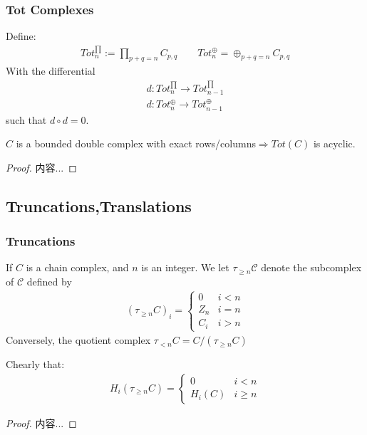 \documentclass[Total.tex]{subfiles}
\begin{document}
			\subsubsection{Tot Complexes}
			\begin{Def}
				Define:
				\begin{gather*}
					Tot^{\prod}_n:= \prod_{p+q=n} C_{p,q}\qquad  Tot^{\oplus}_n=\oplus_{p+q=n}C_{p,q}
				\end{gather*}
				With the differential
				\begin{gather*}
					d:Tot^{\prod}_n\rightarrow Tot^{\prod}_{n-1}\\
					d:Tot^{\oplus}_n\rightarrow Tot^{\oplus}_{n-1}
				\end{gather*}
				such that $d\circ d=0$.
			\end{Def}
			
			\begin{proposition}
				$C$ is a bounded double complex with exact rows/columns$\Rightarrow Tot(C)$ is acyclic.
			\end{proposition}
			\begin{proof}
				内容...
			\end{proof}
			\subsection{Truncations,Translations}
			\subsubsection{Truncations}
			\begin{Def} If $C$ is a chain complex, and $n$ is an integer. We let $\tau_{\geq n} \mathcal{C}$ denote the subcomplex of $\mathcal{C}$ defined by
				\begin{gather*}
					(\tau_{\geq n} C)_i=\begin{cases}
						0&i<n\\
						Z_n&i=n\\
						C_i&i>n
					\end{cases}
				\end{gather*}
				Conversely, the quotient complex $\tau_{<n} C=C/(\tau_{\geq n} C)$
			\end{Def}
			\begin{proposition}
				Chearly that:
				\begin{gather*}
					H_i(\tau_{\geq n}C)=\begin{cases}
						0&i<n\\
						H_i(C)&i\geq n
					\end{cases}
				\end{gather*}
			\end{proposition}
			\begin{proof}
				内容...
			\end{proof}
			
\end{document}
